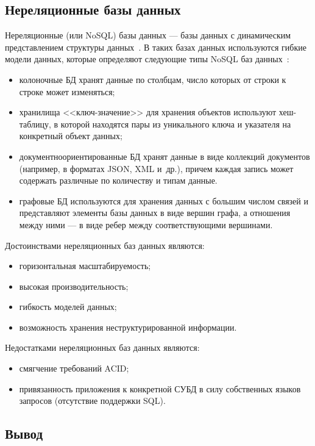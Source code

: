 \subsection{Нереляционные базы данных}

Нереляционные (или NoSQL) базы данных --- базы данных с динамическим
представлением структуры данных~\cite{art04}. В таких базах данных используются
гибкие модели данных, которые определяют следующие типы NoSQL баз
данных~\cite{art05}:
\begin{itemize}
    \item колоночные БД хранят данные по столбцам, число которых от строки к
        строке может изменяться;
    \item хранилища <<ключ-значение>> для хранения объектов используют
        хеш-таблицу, в которой находятся пары из уникального ключа и
        указателя на конкретный объект данных;
    \item документноориентированные БД хранят данные в виде коллекций
        документов (например, в форматах JSON, XML и~др.), причем каждая
        запись может содержать различные по количеству и типам данные.
    \item графовые БД используются для хранения данных с большим числом
        связей и представляют элементы базы данных в виде вершин графа, а
        отношения между ними --- в виде ребер между соответствующими
        вершинами.
\end{itemize}

Достоинствами нереляционных баз данных являются:
\begin{itemize}
    \item горизонтальная масштабируемость;
    \item  высокая производительность;
    \item гибкость моделей данных;
    \item возможность хранения неструктурированной информации.
\end{itemize}

Недостатками нереляционных баз данных являются:
\begin{itemize}
    \item смягчение требований ACID;
    \item привязанность приложения к конкретной СУБД в силу собственных
        языков запросов (отсутствие поддержки SQL).
\end{itemize}

\subsection*{Вывод}

